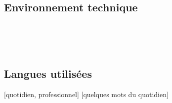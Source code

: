{    \subsection{Environnement technique}
       \\
       \\
       \\
     

    \subsection{Langues utilisées}
    [quotidien, professionnel] [quelques mots du quotidien]
}
\makebody
\clearpage


